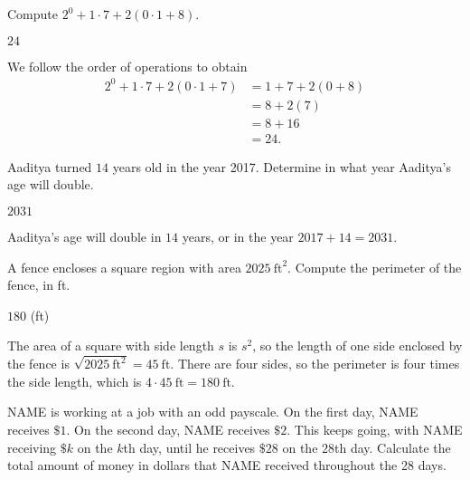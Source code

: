 \documentclass[11pt]{article}
\begin{document}
\setlength{\parindent}{0pt}

\begin{problem}
Compute $2^0 + 1 \cdot 7 + 2(0 \cdot 1 + 8)$.
\end{problem}

\begin{answer}
$\boxed{24}$
\end{answer}

\begin{solution}
We follow the order of operations to obtain
\begin{align*}
2^0 + 1 \cdot 7 + 2(0 \cdot 1 + 7) &= 1 + 7 + 2(0 + 8) \\
&= 8 + 2(7) \\ 
&= 8 + 16 \\
&= \boxed{24}.
\end{align*}
\end{solution}


\begin{problem}
Aaditya turned $14$ years old in the year 2017. Determine in what year Aaditya's age will double.
\end{problem}

\begin{answer}
$\boxed{2031}$
\end{answer}

\begin{solution}
Aaditya's age will double in $14$ years, or in the year $2017 + 14 = \boxed{2031}$.
\end{solution}


\begin{problem}
A fence encloses a square region with area $2025\ \text{ft}^2$. Compute the perimeter of the fence, in ft.
\end{problem}

\begin{answer}
$\boxed{180}$ (ft)
\end{answer}

\begin{solution}
The area of a square with side length $s$ is $s^2$, so the length of one side enclosed by the fence is
$\sqrt{2025\ \text{ft}^2} = 45\ \text{ft}$. There are four sides, so the perimeter is four times the side
length, which is $4 \cdot 45\ \text{ft} = \boxed{180}\ \text{ft}$.
\end{solution}


\begin{problem}
NAME is working at a job with an odd payscale. On the first day, NAME receives $\$1$.
On the second day, NAME receives $\$2$. This keeps going, with NAME receiving $\$k$ on
the $k$th day, until he receives $\$28$ on the $28$th day. Calculate the total amount
of money in dollars that NAME received throughout the 28 days.
\end{problem}
\end{document}
